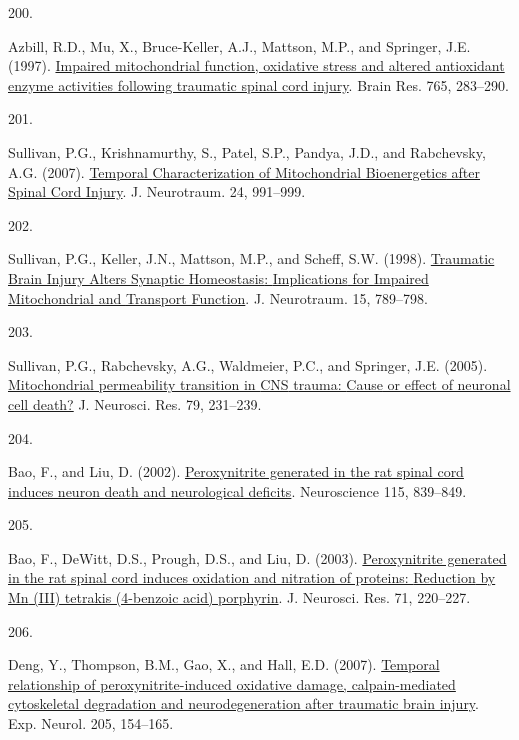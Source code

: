 \documentclass[
]{article}
\newlength{\cslhangindent}
\newlength{\csllabelwidth}
\newlength{\cslentryspacingunit} %
\newenvironment{CSLReferences}[2] %
 {%
  \setlength{\parindent}{0pt}
  \ifodd #1
  \let\oldpar\par
  \def\par{\hangindent=\cslhangindent\oldpar}
  \fi
  \setlength{\parskip}{#2\cslentryspacingunit}
 }%
 {}
\newcommand{\CSLLeftMargin}[1]{\parbox[t]{\csllabelwidth}{#1}}
\newcommand{\CSLRightInline}[1]{\parbox[t]{\linewidth - \csllabelwidth}{#1}\break}
\begin{document}
\begin{CSLReferences}{0}{0}
\leavevmode{}%
\CSLLeftMargin{200. }
\CSLRightInline{Azbill, R.D., Mu, X., Bruce-Keller, A.J., Mattson, M.P., and Springer, J.E. (1997). \href{https://doi.org/10.1016/S0006-8993(97)00573-8}{Impaired mitochondrial function, oxidative stress and altered antioxidant enzyme activities following traumatic spinal cord injury}. Brain Res. 765, 283--290.}

\leavevmode{}%
\CSLLeftMargin{201. }
\CSLRightInline{Sullivan, P.G., Krishnamurthy, S., Patel, S.P., Pandya, J.D., and Rabchevsky, A.G. (2007). \href{https://doi.org/10.1089/neu.2006.0242}{Temporal {Characterization} of {Mitochondrial Bioenergetics} after {Spinal Cord Injury}}. J. Neurotraum. 24, 991--999.}

\leavevmode{}%
\CSLLeftMargin{202. }
\CSLRightInline{Sullivan, P.G., Keller, J.N., Mattson, M.P., and Scheff, S.W. (1998). \href{https://doi.org/10.1089/neu.1998.15.789}{Traumatic {Brain Injury Alters Synaptic Homeostasis}: {Implications} for {Impaired Mitochondrial} and {Transport Function}}. J. Neurotraum. 15, 789--798.}

\leavevmode{}%
\CSLLeftMargin{203. }
\CSLRightInline{Sullivan, P.G., Rabchevsky, A.G., Waldmeier, P.C., and Springer, J.E. (2005). \href{https://doi.org/10.1002/jnr.20292}{Mitochondrial permeability transition in {CNS} trauma: {Cause} or effect of neuronal cell death?} J. Neurosci. Res. 79, 231--239.}

\leavevmode{}%
\CSLLeftMargin{204. }
\CSLRightInline{Bao, F., and Liu, D. (2002). \href{https://doi.org/10.1016/S0306-4522(02)00506-7}{Peroxynitrite generated in the rat spinal cord induces neuron death and neurological deficits}. Neuroscience 115, 839--849.}

\leavevmode{}%
\CSLLeftMargin{205. }
\CSLRightInline{Bao, F., DeWitt, D.S., Prough, D.S., and Liu, D. (2003). \href{https://doi.org/10.1002/jnr.10481}{Peroxynitrite generated in the rat spinal cord induces oxidation and nitration of proteins: {Reduction} by {Mn} ({III}) tetrakis (4-benzoic acid) porphyrin}. J. Neurosci. Res. 71, 220--227.}

\leavevmode{}%
\CSLLeftMargin{206. }
\CSLRightInline{Deng, Y., Thompson, B.M., Gao, X., and Hall, E.D. (2007). \href{https://doi.org/10.1016/j.expneurol.2007.01.023}{Temporal relationship of peroxynitrite-induced oxidative damage, calpain-mediated cytoskeletal degradation and neurodegeneration after traumatic brain injury}. Exp. Neurol. 205, 154--165.}


\end{CSLReferences}
\end{document}
